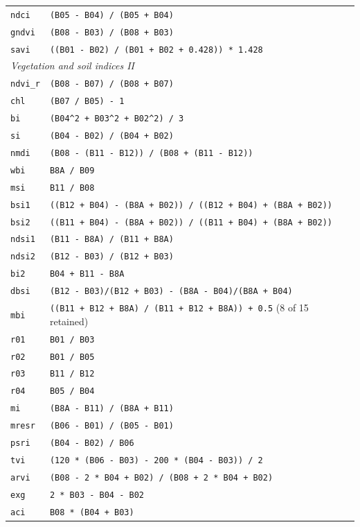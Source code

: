 \documentclass[draft,ea]{agutexSI2019}
\begin{document}
\begin{table}
\begin{tabular}{l p{}}
\texttt{ndci} & \texttt{(B05 - B04) / (B05 + B04)} \\
\texttt{gndvi} & \texttt{(B08 - B03) / (B08 + B03)} \\
\texttt{savi} & \texttt{((B01 - B02) / (B01 + B02 + 0.428)) * 1.428} \\
\multicolumn{2}{l}{\textit{Vegetation and soil indices II}} \\
\texttt{ndvi\_r} & \texttt{(B08 - B07) / (B08 + B07)} \\
\texttt{chl} & \texttt{(B07 / B05) - 1} \\
\texttt{bi} & \texttt{(B04\^{}2 + B03\^{}2 + B02\^{}2) / 3} \\
\texttt{si} & \texttt{(B04 - B02) / (B04 + B02)} \\
\texttt{nmdi} & \texttt{(B08 - (B11 - B12)) / (B08 + (B11 - B12))} \\
\texttt{wbi} & \texttt{B8A / B09} \\
\texttt{msi} & \texttt{B11 / B08} \\
\texttt{bsi1} & \texttt{((B12 + B04) - (B8A + B02)) / ((B12 + B04) + (B8A + B02))} \\
\texttt{bsi2} & \texttt{((B11 + B04) - (B8A + B02)) / ((B11 + B04) + (B8A + B02))} \\
\texttt{ndsi1} & \texttt{(B11 - B8A) / (B11 + B8A)} \\
\texttt{ndsi2} & \texttt{(B12 - B03) / (B12 + B03)} \\
\texttt{bi2} & \texttt{B04 + B11 - B8A} \\
\texttt{dbsi} & \texttt{(B12 - B03)/(B12 + B03) - (B8A - B04)/(B8A + B04)} \\
\texttt{mbi} & \texttt{((B11 + B12 + B8A) / (B11 + B12 + B8A)) + 0.5} (8 of 15 retained) \\
\texttt{r01} & \texttt{B01 / B03} \\
\texttt{r02} & \texttt{B01 / B05} \\
\texttt{r03} & \texttt{B11 / B12} \\
\texttt{r04} & \texttt{B05 / B04} \\
\texttt{mi} & \texttt{(B8A - B11) / (B8A + B11)} \\
\texttt{mresr} & \texttt{(B06 - B01) / (B05 - B01)} \\
\texttt{psri} & \texttt{(B04 - B02) / B06} \\
\texttt{tvi} & \texttt{(120 * (B06 - B03) - 200 * (B04 - B03)) / 2} \\
\texttt{arvi} & \texttt{(B08 - 2 * B04 + B02) / (B08 + 2 * B04 + B02)} \\
\texttt{exg} & \texttt{2 * B03 - B04 - B02} \\
\texttt{aci} & \texttt{B08 * (B04 + B03)} \\
\hline
\end{tabular}
\end{table}
\end{document}
